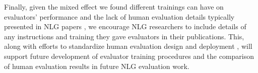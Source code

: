 Finally, given the mixed effect we found different trainings can have on evaluators' performance and the lack of human evaluation details typically presented in NLG papers \citep{van-der-lee-etal-2019-best, howcroft-etal-2020-twenty}, we encourage NLG researchers to include details of any instructions and training they gave evaluators in their publications.
This, along with efforts to standardize human evaluation design \citep{belz-etal-2020-disentangling, howcroft-etal-2020-twenty} and deployment \citep{genie, gem}, will support future development of evaluator training procedures and the comparison of human evaluation results in future NLG evaluation work.